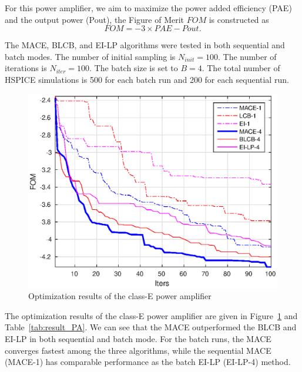 For this power amplifier, we aim to maximize the power added efficiency (PAE) and the output power (Pout), the Figure of Merit $FOM$ is constructed as
$$
\mathit{FOM} = -3 \times \mathit{PAE} - \mathit{Pout}.
$$

The MACE, BLCB, and EI-LP algorithms were tested in both sequential and batch
modes. The number of initial sampling is $N_{init} = 100$. The number of
iterations is $N_{iter} = 100$. The batch size is set to $B = 4$. The total
number of HSPICE simulations is 500 for each batch run and 200 for each
sequential run.

\begin{figure}[!htb]
    \begin{center}
        \centerline{\includegraphics[width=\columnwidth]{./img/ClassE_mean.eps}}
        \caption{Optimization results of the class-E power amplifier}
        \label{fig:resClassE}
    \end{center}
    \vskip -0.2in
\end{figure}


The optimization results of the class-E power amplifier are given in
Figure~\ref{fig:resClassE} and Table~\ref{tab:result_PA}. We can see that the
MACE outperformed the BLCB and EI-LP in both sequential and batch mode. For the
batch runs, the MACE converges fastest among the three algorithms, while the
sequential MACE (MACE-1) has comparable performance as the batch EI-LP
(EI-LP-4) method.

